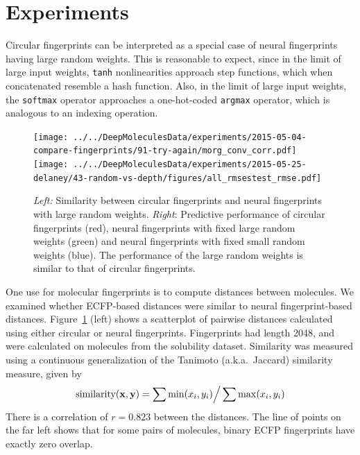 \documentclass{article}
\newcommand{\vx}{\mathbf{x}}
\newcommand{\vy}{\mathbf{y}}
\begin{document}
\section{Experiments}
\label{sec:experiments}

\label{sec:random is equivalent}
Circular fingerprints can be interpreted as a special case of neural fingerprints having large random weights.
This is reasonable to expect, since in the limit of large input weights, \texttt{tanh} nonlinearities approach step functions, which when concatenated resemble a hash function.
Also, in the limit of large input weights, the \texttt{softmax} operator approaches a one-hot-coded \texttt{argmax} operator, which is analogous to an indexing operation.

\begin{figure}[h]
\centerline{\texttt{[image: ../../DeepMoleculesData/experiments/2015-05-04-compare-fingerprints/91-try-again/morg\_conv\_corr.pdf]}
\texttt{[image: ../../DeepMoleculesData/experiments/2015-05-25-delaney/43-random-vs-depth/figures/all\_rmsestest\_rmse.pdf]}}
\caption{\emph{Left:} Similarity between circular fingerprints and neural fingerprints with large random weights.
\emph{Right}: Predictive performance of circular fingerprints (red), neural fingerprints with fixed large random weights (green) and neural fingerprints with fixed small random weights (blue).
The performance of the large random weights is similar to that of circular fingerprints.}
\label{fig:fingerprint similarity}
\end{figure}

One use for molecular fingerprints is to compute distances between molecules.
We examined whether ECFP-based distances were similar to neural fingerprint-based distances.
Figure~\ref{fig:fingerprint similarity} (left) shows a scatterplot of pairwise distances calculated using either  circular or neural fingerprints.
Fingerprints had length 2048, and were calculated on molecules from the \citet{delaney_data_2004} solubility dataset.
Similarity was measured using a continuous generalization of the Tanimoto (a.k.a.\ Jaccard) similarity measure, given by
\begin{equation}
\textnormal{similarity}(\vx, \vy) =  \sum \min(x_i, y_i) \Big/ \sum \max(x_i, y_i)
\end{equation}
There is a correlation of $r = 0.823$ between the distances.
The line of points on the far left shows that for some pairs of molecules, binary ECFP fingerprints have exactly zero overlap.
\end{document}
